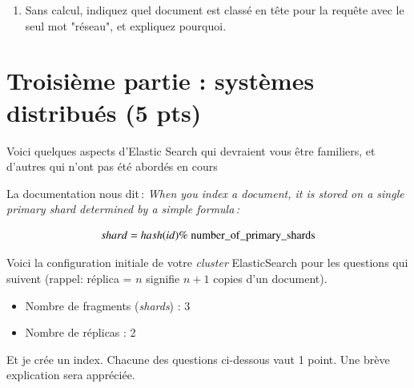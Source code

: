 \documentclass[11pt,a4paper]{article}
\begin{document}
\begin{enumerate}
  \begin{itemize}
    \item processeur et réseau
    \item harmonie et orchestre
  \end{itemize}
\item Sans calcul, indiquez quel document est classé en tête pour la requête
    avec le seul mot "réseau", et expliquez pourquoi.
%

\end{enumerate}


\section*{Troisième partie : systèmes distribués (5 pts)}

Voici quelques aspects d'Elastic Search qui devraient vous être familiers, 
et d'autres qui n'ont pas été abordés en cours

La documentation nous dit\,:
\textit{When you index a document, it is stored on a single primary shard determined by a simple formula\,:}

    $$shard = hash(id) \%\ \rm{number\_of\_primary\_shards}$$
    
Voici la configuration initiale de votre \textit{cluster} ElasticSearch pour les questions qui suivent 
(rappel: réplica = $n$ signifie $n+1$ copies d'un document).

   \begin{itemize}
      \item Nombre de fragments (\textit{shards}) : 3
       \item Nombre de réplicas : 2
   \end{itemize} 

Et je crée un index. Chacune des questions ci-dessous vaut 1 point. Une brève explication sera appréciée.
\end{document}
